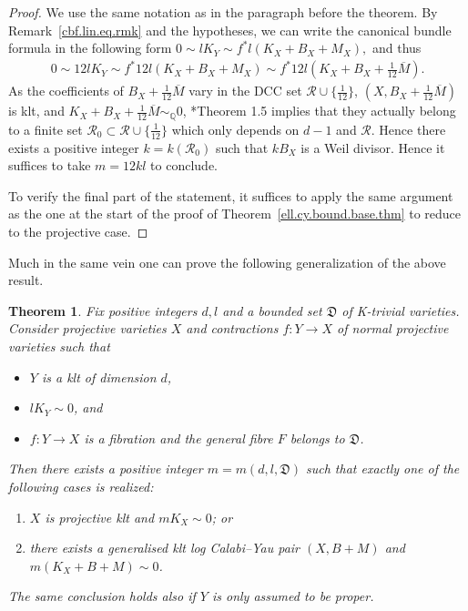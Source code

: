 \documentclass[11pt]{ip-journal}
\newtheorem{theorem}{Theorem}[section]
\theoremstyle{definition}
\begin{document}
\begin{proof}
We use the same notation as in the paragraph before the theorem.
\newline
By Remark~\ref{cbf.lin.eq.rmk} and the hypotheses, we can write the canonical bundle formula in the following form
$
0 \sim lK_Y \sim f^\ast l(K_X+B_X+M_X),
$
and thus
\begin{align*}
0 \sim 12lK_Y \sim f^\ast 12l(K_X+B_X+M_X) \sim f^\ast 12l(K_X+B_X+\frac{1}{12}\overline M).
\end{align*}
As the coefficients of 
$B_{X} + \frac{1}{12} \overline{M}$
vary in the DCC set 
$\mathcal R \cup \{\frac{1}{12}\}$, 
$(X, B_X+\frac{1}{12}\overline M)$ 
is klt, and
$K_{X} + B_{X} + \frac{1}{12} \overline{M} \sim_\mathbb{Q} 0$,
\cite{MR3224718}*{Theorem 1.5} implies that they actually belong to a finite set 
$\mathcal R_0 \subset \mathcal R \cup \{\frac{1}{12}\}$
which only depends on 
$d-1$ 
and 
$\mathcal R$.
Hence there exists a positive integer 
$k=k(\mathcal R_0)$ 
such that 
$kB_{X}$ 
is a Weil divisor.
Hence it suffices to take $m=12kl$ to conclude.

To verify the final part of the statement, it suffices to apply the same argument as the one at the start of the proof of Theorem~\ref{ell.cy.bound.base.thm} to reduce to the projective case.
\end{proof}

Much in the same vein one can prove the following generalization of the above result.

\begin{theorem}
\label{index.fibr.gen.thm}
Fix positive integers 
$d, l$ 
and a bounded set 
$\mathfrak{D}$ 
of K-trivial varieties.
Consider projective varieties 
$X$ 
and contractions 
$f \colon Y \to X$
of normal projective varieties such that
\begin{itemize}
    \item 
$Y$ 
is a klt of dimension 
$d$,

    \item 
$lK_Y \sim 0$, 
and

    \item 
$f \colon Y \to X$ 
is a fibration and the general fibre 
$F$ 
belongs to 
$\mathfrak{D}$.
\end{itemize}
Then there exists a positive integer
$m=m(d, l, \mathfrak{D})$ 
such that exactly one of the following cases is realized:
\begin{enumerate}
	\item[(a)] 
$X$ 
is projective klt and 
$mK_X \sim 0$; 
or

	\item[(b)] 
there exists a generalised klt log Calabi--Yau pair 
$(X, B+M)$ 
and 
$m(K_X+B+M) \sim 0$.
\end{enumerate}

The same conclusion holds also if 
$Y$
is only assumed to be proper.

\end{theorem}
\end{document}
